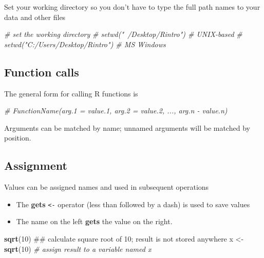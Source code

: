 \documentclass[]{book}
\newenvironment{Shaded}{\begin{snugshade}}{\end{snugshade}}
\newcommand{\KeywordTok}[1]{\textcolor[rgb]{0.13,0.29,0.53}{\textbf{#1}}}
\newcommand{\DecValTok}[1]{\textcolor[rgb]{0.00,0.00,0.81}{#1}}
\newcommand{\StringTok}[1]{\textcolor[rgb]{0.31,0.60,0.02}{#1}}
\newcommand{\CommentTok}[1]{\textcolor[rgb]{0.56,0.35,0.01}{\textit{#1}}}
\newcommand{\NormalTok}[1]{#1}
\providecommand{\tightlist}{%
  \setlength{\itemsep}{0pt}\setlength{\parskip}{0pt}}
\begin{document}
Set your working directory so you don't have to type the full path names
to your data and other files

\begin{Shaded}
\begin{Highlighting}[]
  \CommentTok{# set the working directory}
  \CommentTok{# setwd("~/Desktop/Rintro") # UNIX-based}
  \CommentTok{# setwd("C:/Users/Desktop/Rintro") # MS Windows}
\end{Highlighting}
\end{Shaded}

\subsection{Function calls}\label{function-calls}

The general form for calling R functions is

\begin{Shaded}
\begin{Highlighting}[]
\CommentTok{# FunctionName(arg.1 = value.1, arg.2 = value.2, ..., arg.n - value.n)}
\end{Highlighting}
\end{Shaded}

Arguments can be matched by name; unnamed arguments will be matched by
position.

\subsection{Assignment}\label{assignment}

Values can be assigned names and used in subsequent operations

\begin{itemize}
\tightlist
\item
  The \textbf{gets} \texttt{\textless{}-} operator (less than followed
  by a dash) is used to save values
\item
  The name on the left \textbf{gets} the value on the right.
\end{itemize}

\begin{Shaded}
\begin{Highlighting}[]
\KeywordTok{sqrt}\NormalTok{(}\DecValTok{10}\NormalTok{) ## calculate square root of 10; result is not stored anywhere}
\NormalTok{x <-}\StringTok{ }\KeywordTok{sqrt}\NormalTok{(}\DecValTok{10}\NormalTok{) }\CommentTok{# assign result to a variable named x}
\end{Highlighting}
\end{Shaded}
\end{document}
